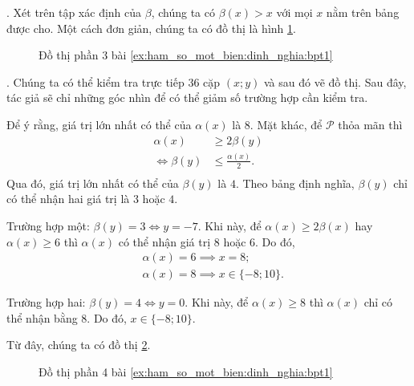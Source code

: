 . Xét trên tập xác định của $\beta$, chúng ta có $\beta(x) > x$ với mọi $x$ nằm trên bảng được cho. Một cách đơn giản, chúng ta có đồ thị là hình \ref{fig:ham_so_mot_bien:dinh_nghia:bpt3}.

\begin{figure}[H]
   \centering
   \caption{Đồ thị phần 3 bài \ref{ex:ham_so_mot_bien:dinh_nghia:bpt1}}
   \label{fig:ham_so_mot_bien:dinh_nghia:bpt3}
\end{figure}

. Chúng ta có thể kiểm tra trực tiếp $36$ cặp $(x; y)$ và sau đó vẽ đồ thị. Sau đây, tác giả sẽ chỉ những góc nhìn để có thể giảm số trường hợp cần kiểm tra.

Để ý rằng, giá trị lớn nhất có thể của $\alpha(x)$ là $8$. Mặt khác, để $\mathcal{P}$ thỏa mãn thì
\begin{align*}
   \alpha(x) &\geq 2\beta(y) \\
   \iff \beta(y) &\leq \frac{\alpha(x)}{2}. \\
\end{align*}
Qua đó, giá trị lớn nhất có thể của $\beta(y)$ là $4$. Theo bảng định nghĩa, $\beta(y)$ chỉ có thể nhận hai giá trị là $3$ hoặc $4$. 

\textcolor{colorEmphasisCyan}{Trường hợp một}: $\beta(y) = 3 \iff y = -7$. Khi này, để $\alpha(x) \geq 2\beta(x)$ hay $\alpha(x) \geq 6$ thì $\alpha(x)$ có thể nhận giá trị $8$ hoặc $6$. Do đó,
\begin{align*}
   &\alpha(x) = 6 \implies x = 8;\\
   &\alpha(x) = 8 \implies x \in \{-8; 10\}.
\end{align*}

\textcolor{colorEmphasis}{Trường hợp hai}: $\beta(y) = 4 \iff y = 0$. Khi này, để $\alpha(x) \geq 8$ thì $\alpha(x)$ chỉ có thể nhận bằng $8$. Do đó, $x \in \{-8; 10\}$.

Từ đây, chúng ta có đồ thị \ref{fig:ham_so_mot_bien:dinh_nghia:bpt4}.

\begin{figure}[H]
   \centering
   \caption{Đồ thị phần 4 bài \ref{ex:ham_so_mot_bien:dinh_nghia:bpt1}}
   \label{fig:ham_so_mot_bien:dinh_nghia:bpt4}
\end{figure}

